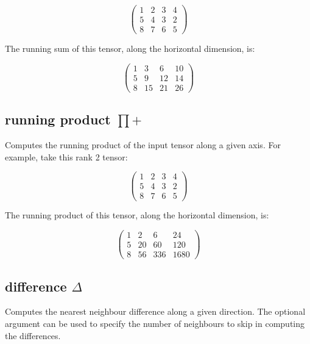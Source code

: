 \begin{displaymath}
  \left(
    \begin{array}{cccc}
      1& 2& 3& 4 \\
      5& 4& 3& 2 \\
      8& 7& 6& 5
    \end{array}
  \right)
\end{displaymath}

The running sum of this tensor, along the horizontal dimension, is:

\begin{displaymath}
  \left(
    \begin{array}{cccc}
      1& 3& 6& 10 \\
      5& 9& 12& 14 \\
      8& 15& 21& 26
    \end{array}
  \right)
\end{displaymath}

\subsection{running product $\prod+$}
\label{Operation:runningProduct} Computes the running product of the
input tensor along a given axis. For example, take this rank 2 tensor:

\begin{displaymath}
  \left(
    \begin{array}{cccc}
      1& 2& 3& 4\\ 
      5& 4& 3& 2\\ 
      8& 7& 6& 5 
    \end{array}
  \right)
\end{displaymath}

The running product of this tensor, along the horizontal dimension,
is:

\begin{displaymath}
  \left(
    \begin{array}{cccc}
      1& 2& 6& 24\\ 
      5& 20& 60& 120\\ 
      8& 56& 336& 1680 
    \end{array}
  \right)
\end{displaymath}

\subsection{difference $\Delta$}\label{Operation:difference}
Computes the nearest neighbour difference along a given direction. The
optional argument can be used to specify the number of neighbours to
skip in computing the differences.

